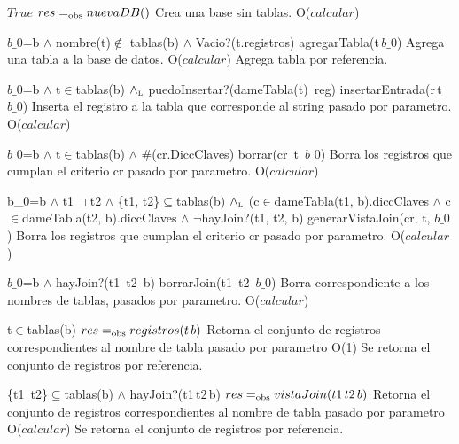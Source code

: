  
 {$True$}
 {$res =_{\mathrm{obs}} nuevaDB()$}
 {Crea una base sin tablas.}
 {O($calcular$)}
 {}

 {$b\_0$=b $\land$ nombre(t)$\notin$ tablas(b) $\land$ Vacio?(t.registros)}
 {agregarTabla(t\,$b\_0$)}
 {Agrega una tabla a la base de datos.}
 {O($calcular$)}
 {Agrega tabla por referencia.} 
 
 {$b\_0$=b $\land$ t$\in$tablas(b) $\land_{\mathrm{\scriptscriptstyle{L}}}$ puedoInsertar?(dameTabla(t)\, reg)}
 {insertarEntrada(r\,t \,$b\_0$)}
 {Inserta el registro a la tabla que corresponde al string pasado por parametro.}
 {O($calcular$)}
 {} 
 
 {$b\_0$=b $\land$ t$\in$tablas(b) $\land$ \#(cr.DiccClaves)}
 {borrar(cr\, t\, $b\_0$)}
 {Borra los registros que cumplan el criterio cr pasado por parametro.}
 {O($calcular$)}
 {} 	

 {b\_0=b $\land$ t1$\sqsupset$t2 $\land$ \{t1, t2\}$\subseteq$tablas(b) $\land_{\mathrm{\scriptscriptstyle{L}}}$ (c$\in$dameTabla(t1, b).diccClaves $\land$ c$\in$dameTabla(t2, b).diccClaves $\land$ $\neg$hayJoin?(t1, t2, b)}
 {generarVistaJoin(cr, t, $b\_0$)}
 {Borra los registros que cumplan el criterio cr pasado por parametro.}
 {O($calcular$)}
 {} 	

 {$b\_0$=b $\land$ hayJoin?(t1\, t2\, b)}
 {borrarJoin(t1\, t2\, $b\_0$)}
 {Borra correspondiente a los nombres de tablas, pasados por parametro.}
 {O($calcular$)}
 {}


 {t$\in$tablas(b)}
 {$res =_{\mathrm{obs}} registros(t\, b)$}
 {Retorna el conjunto de registros correspondientes al nombre de tabla pasado por parametro}
 {O(1)}
 {Se retorna el conjunto de registros por referencia.} 


 {\{t1\, t2\}$\subseteq$tablas(b) $\land$ hayJoin?(t1\,t2\,b)}
 {$res =_{\mathrm{obs}} vistaJoin(t1\, t2\, b)$}
 {Retorna el conjunto de registros correspondientes al nombre de tabla pasado por parametro}
 {O($calcular$)}
 {Se retorna el conjunto de registros por referencia.} 

